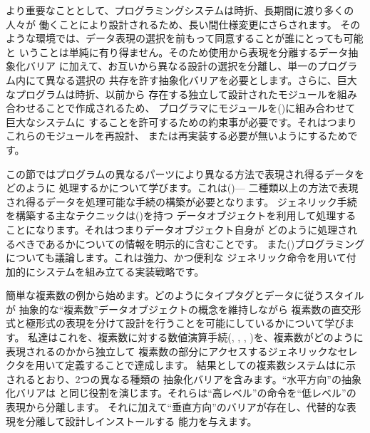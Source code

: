 より重要なこととして、プログラミングシステムは時折、長期間に渡り多くの人々が
働くことにより設計されるため、長い間仕様変更にさらされます。
そのような環境では、データ表現の選択を前もって同意することが誰にとっても可能と
いうことは単純に有り得ません。そのため使用から表現を分離するデータ抽象化バリア
に加えて、お互いから異なる設計の選択を分離し、単一のプログラム内にて異なる選択の
共存を許す抽象化バリアを必要とします。さらに、巨大なプログラムは時折、以前から
存在する独立して設計されたモジュールを組み合わせることで作成されるため、
プログラマにモジュールを()に組み合わせて巨大なシステムに
することを許可するための約束事が必要です。それはつまりこれらのモジュールを再設計、
または再実装する必要が無いようにするためです。


この節ではプログラムの異なるパーツにより異なる方法で表現され得るデータをどのように
処理するかについて学びます。これは()---
二種類以上の方法で表現され得るデータを処理可能な手続の構築が必要となります。
ジェネリック手続を構築する主なテクニックは()を持つ
データオブジェクトを利用して処理することになります。それはつまりデータオブジェクト自身が
どのように処理されるべきであるかについての情報を明示的に含むことです。
また()プログラミングについても議論します。これは強力、かつ便利な
ジェネリック命令を用いて付加的にシステムを組み立てる実装戦略です。


簡単な複素数の例から始めます。どのようにタイプタグとデータに従うスタイルが
抽象的な``複素数''データオブジェクトの概念を維持しながら
複素数の直交形式と極形式の表現を分けて設計を行うことを可能にしているかについて学びます。
私達はこれを、複素数に対する数値演算手続(, ,
, )を、複素数がどのように表現されるのかから独立して
複素数の部分にアクセスするジェネリックなセレクタを用いて定義することで達成します。
結果としての複素数システムはに示されるとおり、2つの異なる種類の
抽象化バリアを含みます。``水平方向''の抽象化バリアは
と同じ役割を演じます。それらは``高レベル''の命令を``低レベル''の表現から分離します。
それに加えて``垂直方向''のバリアが存在し、代替的な表現を分離して設計しインストールする
能力を与えます。

